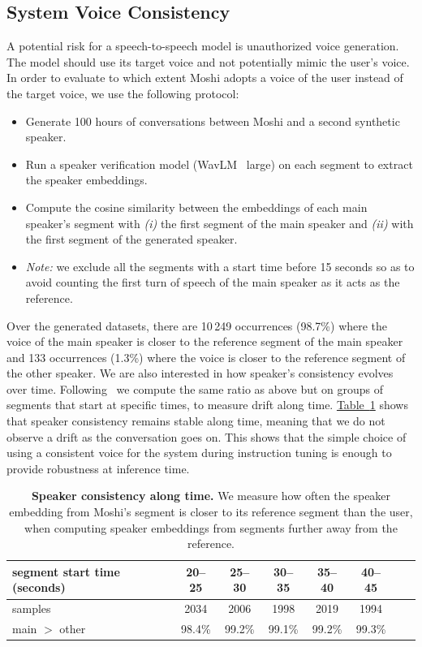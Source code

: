 \subsection{System Voice Consistency}
\label{sec:voice_consistency}
A potential risk for a speech-to-speech model is unauthorized voice generation.
The model should use its target voice and not potentially mimic the user's voice.
In order to evaluate to which extent Moshi adopts a voice of the user instead of the target voice, we use the following protocol:
\begin{itemize}
\item Generate 100 hours of conversations between Moshi and a second synthetic speaker.
\item Run a speaker verification model (WavLM~\citep{wavlm} large) on each segment to extract the speaker embeddings.
\item Compute the cosine similarity between the embeddings of each main speaker's segment with \emph{(i)} the first segment of the main speaker and \emph{(ii)} with the first segment of the generated speaker.
\item \noindent \textit{Note:} we exclude all the segments with a start time before 15 seconds so as to avoid counting the first turn of speech of the main speaker as it acts as the reference.
\end{itemize}

Over the generated datasets, there are 10\,249 occurrences (98.7\%) where the voice of the main speaker is closer to the reference segment of the main speaker and 133 occurrences (1.3\%) where the voice is closer to the reference segment of the other speaker.
We are also interested in how speaker's consistency evolves over time. Following~\citet{soundstorm} we compute the same
ratio as above but on groups of segments that start at specific times, to measure drift along time. \hyperref[tab:speaker_consistency]{Table~\ref{tab:speaker_consistency}} shows that speaker consistency remains stable along time, meaning that we do not observe a drift as the conversation goes on. This shows that the simple choice of using a consistent voice for the system during instruction tuning is enough to provide robustness at inference time.

\begin{table}[t]
\caption{\textbf{Speaker consistency along time.} We measure how often the speaker embedding from Moshi's segment is closer to its reference segment than the user, when computing speaker embeddings from segments further away from the reference.}
\label{tab:speaker_consistency}
\centering 
{\footnotesize
\begin{tabular}{lccccccc}
\toprule
segment start time (seconds) & 20--25 & 25--30 & 30--35 & 35--40 & 40--45 \\
\midrule
samples & 2034 & 2006 & 1998 & 2019 & 1994 \\
main $>$ other & 98.4\% & 99.2\% & 99.1\% & 99.2\% & 99.3\% \\
\bottomrule
\end{tabular}}%
\end{table}



